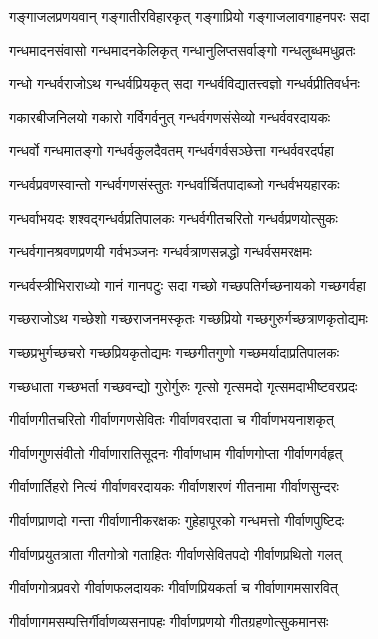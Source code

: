 \twolineshloka
{गङ्गाजलप्रणयवान् गङ्गातीरविहारकृत्}%
{गङ्गाप्रियो गङ्गाजलावगाहनपरः सदा}%

\twolineshloka
{गन्धमादनसंवासो गन्धमादनकेलिकृत्}%
{गन्धानुलिप्तसर्वाङ्गो गन्धलुब्धमधुव्रतः}%

\twolineshloka
{गन्धो गन्धर्वराजोऽथ गन्धर्वप्रियकृत् सदा}%
{गन्धर्वविद्यातत्त्वज्ञो गन्धर्वप्रीतिवर्धनः}%

\twolineshloka
{गकारबीजनिलयो गकारो गर्विगर्वनुत्}%
{गन्धर्वगणसंसेव्यो गन्धर्ववरदायकः}%

\twolineshloka
{गन्धर्वो गन्धमातङ्गो गन्धर्वकुलदैवतम्}%
{गन्धर्वगर्वसञ्छेत्ता गन्धर्ववरदर्पहा}%

\twolineshloka
{गन्धर्वप्रवणस्वान्तो गन्धर्वगणसंस्तुतः}%
{गन्धर्वार्चितपादाब्जो गन्धर्वभयहारकः}%

\twolineshloka
{गन्धर्वाभयदः शश्वद्गन्धर्वप्रतिपालकः}%
{गन्धर्वगीतचरितो गन्धर्वप्रणयोत्सुकः}%

\twolineshloka
{गन्धर्वगानश्रवणप्रणयी गर्वभञ्जनः}%
{गन्धर्वत्राणसन्नद्धो गन्धर्वसमरक्षमः}%

\twolineshloka
{गन्धर्वस्त्रीभिराराध्यो गानं गानपटुः सदा}%
{गच्छो गच्छपतिर्गच्छनायको गच्छगर्वहा}%

\twolineshloka
{गच्छराजोऽथ गच्छेशो गच्छराजनमस्कृतः}%
{गच्छप्रियो गच्छगुरुर्गच्छत्राणकृतोद्यमः}%

\twolineshloka
{गच्छप्रभुर्गच्छचरो गच्छप्रियकृतोद्यमः}%
{गच्छगीतगुणो गच्छमर्यादाप्रतिपालकः}%

\twolineshloka
{गच्छधाता गच्छभर्ता गच्छवन्द्यो गुरोर्गुरुः}%
{गृत्सो गृत्समदो गृत्समदाभीष्टवरप्रदः}%

\twolineshloka
{गीर्वाणगीतचरितो गीर्वाणगणसेवितः}%
{गीर्वाणवरदाता च गीर्वाणभयनाशकृत्}%

\twolineshloka
{गीर्वाणगुणसंवीतो गीर्वाणारातिसूदनः}%
{गीर्वाणधाम गीर्वाणगोप्ता गीर्वाणगर्वहृत्}%

\twolineshloka
{गीर्वाणार्तिहरो नित्यं गीर्वाणवरदायकः}%
{गीर्वाणशरणं गीतनामा गीर्वाणसुन्दरः}%

\twolineshloka
{गीर्वाणप्राणदो गन्ता गीर्वाणानीकरक्षकः}%
{गुहेहापूरको गन्धमत्तो गीर्वाणपुष्टिदः}%

\twolineshloka
{गीर्वाणप्रयुतत्राता गीतगोत्रो गताहितः}%
{गीर्वाणसेवितपदो गीर्वाणप्रथितो गलत्}%

\twolineshloka
{गीर्वाणगोत्रप्रवरो गीर्वाणफलदायकः}%
{गीर्वाणप्रियकर्ता च गीर्वाणागमसारवित्}%

\twolineshloka
{गीर्वाणागमसम्पत्तिर्गीर्वाणव्यसनापहः}%
{गीर्वाणप्रणयो गीतग्रहणोत्सुकमानसः}%

